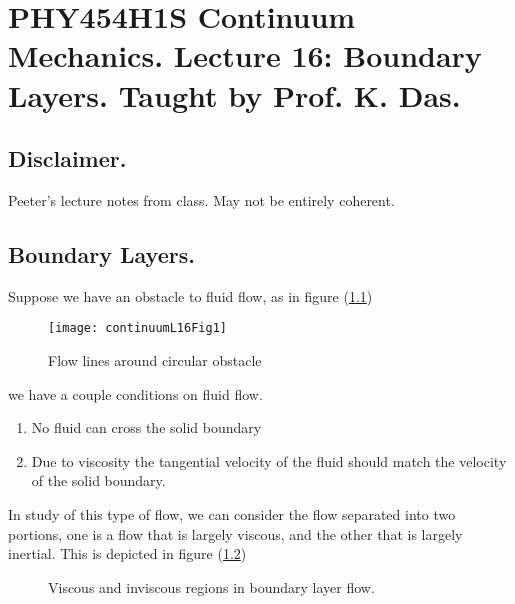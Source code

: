 
%

\chapter{PHY454H1S Continuum Mechanics.  Lecture 16: Boundary Layers.  Taught by Prof. K. Das.}
\label{chap:continuumL16}
{}
\date{Mar 14, 2012}

\beginArtWithToc

\section{Disclaimer.}

Peeter's lecture notes from class.  May not be entirely coherent.

\section{Boundary Layers.}

Suppose we have an obstacle to fluid flow, as in figure (\ref{fig:continuumL16:continuumL16Fig1})
\begin{figure}[htp]
   \centering
   \texttt{[image: continuumL16Fig1]}
   \caption{Flow lines around circular obstacle}\label{fig:continuumL16:continuumL16Fig1}
\end{figure}

we have a couple conditions on fluid flow.

\begin{enumerate}
\item No fluid can cross the solid boundary
\item Due to viscosity the tangential velocity of the fluid should match the velocity of the solid boundary.
\end{enumerate}

In study of this type of flow, we can consider the flow separated into two portions, one is a flow that is largely viscous, and the other that is largely inertial.  This is depicted in figure (\ref{fig:continuumL16:continuumL16Fig2})
\begin{figure}[htp]
   \centering
   \def\svgwidth{0.5\columnwidth}
   
   \caption{Viscous and inviscous regions in boundary layer flow.}\label{fig:continuumL16:continuumL16Fig2}
\end{figure}


